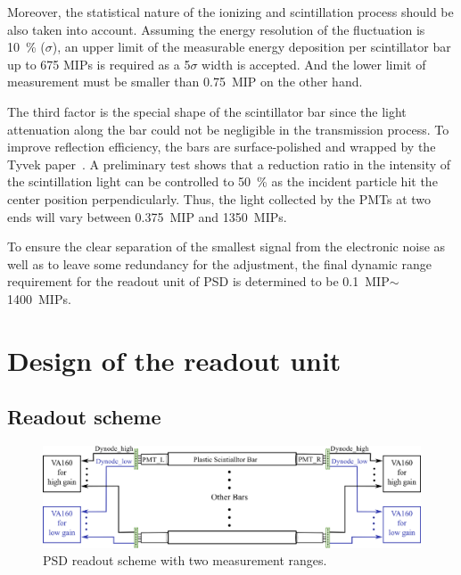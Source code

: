 \documentclass[preprint, times]{elsarticle}
\begin{document}
Moreover, the statistical nature of the ionizing and scintillation process should be also taken into account. Assuming the energy resolution of the fluctuation is \SI{10}{\percent} ($\sigma$), an upper limit of the measurable energy deposition per scintillator bar up to 675 MIPs is required as a 5$\sigma$ width is accepted. And the lower limit of measurement must be smaller than \SI{0.75}{MIP} on the other hand.

The third factor is the special shape of the scintillator bar since the light attenuation along the bar could not be negligible in the transmission process.
To improve reflection efficiency, the bars are surface-polished and wrapped by the Tyvek paper~\cite{tyvek}. A preliminary test shows that a reduction ratio in the intensity of the scintillation light can be controlled to \SI{50}{\percent} as the incident particle hit the center position perpendicularly. Thus, the light collected by the PMTs at two ends will vary between \SI{0.375}{MIP} and \SI{1350}{MIPs}.

To ensure the clear separation of the smallest signal from the electronic noise as well as to leave some redundancy for the adjustment, the final dynamic range requirement for the readout unit of PSD is determined to be \SI{0.1}{MIP}$\sim$\SI{1400}{MIPs}.

\section{Design of the readout unit}
\label{sec:design}

\subsection{Readout scheme}
\label{sec:scheme}

\begin{figure}
\centering
 \includegraphics[width=140mm]{readout_scheme}
\caption{PSD readout scheme with two measurement ranges.}
\label{fig:readout_scheme}
\end{figure}
\end{document}
